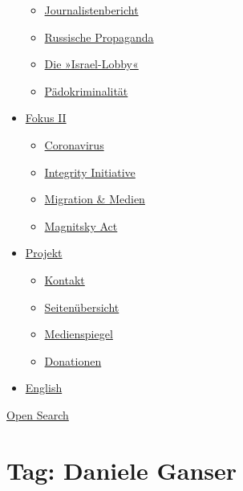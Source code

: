 \begin{itemize}
  \begin{itemize}
  \tightlist
  \item
    \href{https://swprs.org/bericht-eines-journalisten/}{Journalistenbericht}
  \item
    \href{https://swprs.org/russische-propaganda/}{Russische Propaganda}
  \item
    \href{https://swprs.org/die-israel-lobby-fakten-und-mythen/}{Die
    »Israel-Lobby«}
  \item
    \href{https://swprs.org/geopolitik-und-paedokriminalitaet/}{Pädokriminalität}
  \end{itemize}
\item
  \href{https://swprs.org/migration-und-medien/}{Fokus II}

  \begin{itemize}
  \tightlist
  \item
    \href{https://swprs.org/covid-19-hinweis-ii/}{Coronavirus}
  \item
    \href{https://swprs.org/die-integrity-initiative/}{Integrity
    Initiative}
  \item
    \href{https://swprs.org/migration-und-medien/}{Migration \& Medien}
  \item
    \href{https://swprs.org/der-fall-magnitsky/}{Magnitsky Act}
  \end{itemize}
\item
  \href{https://swprs.org/kontakt/}{Projekt}

  \begin{itemize}
  \tightlist
  \item
    \href{https://swprs.org/kontakt/}{Kontakt}
  \item
    \href{https://swprs.org/uebersicht/}{Seitenübersicht}
  \item
    \href{https://swprs.org/medienspiegel/}{Medienspiegel}
  \item
    \href{https://swprs.org/donationen/}{Donationen}
  \end{itemize}
\item
  \href{https://swprs.org/contact/}{English}
\end{itemize}

\protect\hyperlink{}{Open Search}

\hypertarget{tag-daniele-ganser}{%
\section{Tag: Daniele Ganser}\label{tag-daniele-ganser}}

